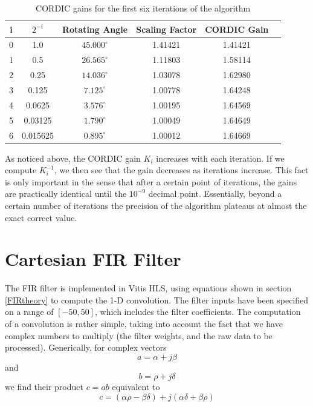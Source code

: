 \documentclass[11pt]{report}
\begin{document}
\begin{table}
\begin{center}
\begin{tabular}{|c|c|c|c|c|c|}
\hline
i & $2^{-i}$ 	& Rotating Angle  	& Scaling Factor 	& CORDIC Gain 	\\ \hline \hline
0 & 1.0 		& $45.000^{\circ}$	& 1.41421			& 1.41421		\\ \hline
1 & 0.5 		& $26.565^{\circ}$	& 1.11803			& 1.58114		\\ \hline
2 & 0.25 		& $14.036^{\circ}$	& 1.03078			& 1.62980		\\ \hline
3 & 0.125 		& $7.125^{\circ}$	& 1.00778			& 1.64248		\\ \hline
4 & 0.0625 	& $3.576^{\circ}$	& 1.00195			& 1.64569		\\ \hline
5 & 0.03125 	& $1.790^{\circ}$	& 1.00049			& 1.64649		\\ \hline
6 & 0.015625 	& $0.895^{\circ}$	& 1.00012			& 1.64669		\\ \hline
\end{tabular}
\end{center}
\caption{CORDIC gains for the first six iterations of the algorithm}
\label{table:cordic}
\end{table}
\FloatBarrier

As noticed above, the CORDIC gain $K_i$ increases with each iteration. If we compute $K_i ^{-1}$, we then see that the gain decreases as iterations increase. This fact is only important in the sense that after a certain point of iterations, the gains are practically identical until the $10^{-9}$ decimal point. Essentially, beyond a certain number of iterations the precision of the algorithm plateaus at almost the exact correct value.

\chapter{Cartesian \ac{FIR} Filter}

The FIR filter is implemented in Vitis HLS, using equations shown in section \ref{FIRtheory} to compute the 1-D convolution. The filter inputs have been specified on a range of $[-50, 50]$, which includes the filter coefficients. The computation of a convolution is rather simple, taking into account the fact that we have complex numbers to multiply (the filter weights, and the raw data to be processed). Generically, for complex vectors
\begin{equation}
	a = \alpha + j\beta
\end{equation}
and 
\begin{equation}
	b = \rho + j\delta
\end{equation}
we find their product $c = ab$ equivalent to
\begin{equation}
	c = (\alpha\rho - \beta\delta) + j(\alpha\delta+\beta\rho)
\end{equation}
\end{document}
